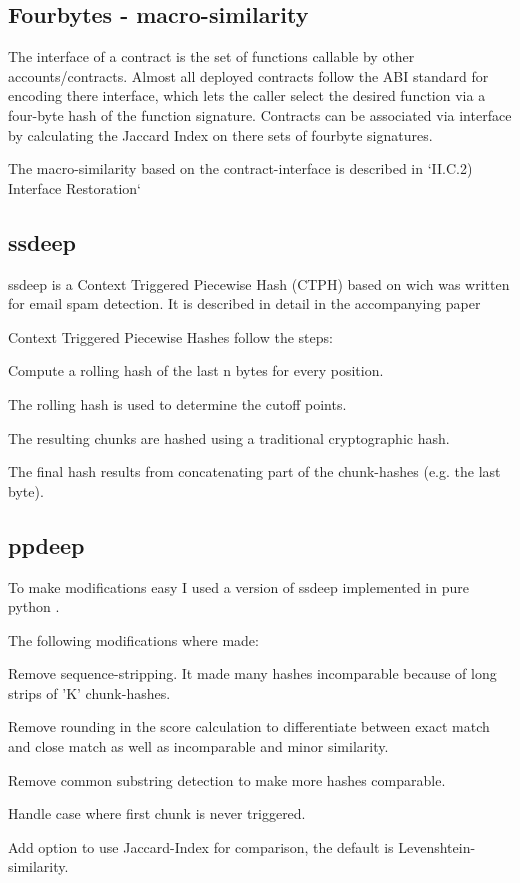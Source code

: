 \documentclass[../main.tex]{subfiles}
\begin{document}
\subsection{Fourbytes - macro-similarity}

The interface of a contract is the set of functions callable by other accounts/contracts.
Almost all deployed contracts follow the ABI standard for encoding there interface, which lets the caller select the desired function via a four-byte hash of the function signature.
Contracts can be associated via interface by calculating the Jaccard Index on there sets of fourbyte signatures.

The macro-similarity based on the contract-interface is described in `II.C.2) Interface Restoration` 

\subsection{ssdeep}
ssdeep is a Context Triggered Piecewise Hash (CTPH) based on  wich was written for email spam detection. It is described in detail in the accompanying paper 

Context Triggered Piecewise Hashes follow the steps:
\begin{ol}
  \item Compute a rolling hash of the last n bytes for every position.
  \item The rolling hash is used to determine the cutoff points.
  \item The resulting chunks are hashed using a traditional cryptographic hash.
  \item The final hash results from concatenating part of the chunk-hashes (e.g. the last byte).
\end{ol}

\subsection{ppdeep}
To make modifications easy I used a version of ssdeep implemented in pure python .

The following modifications where made:
\begin{ul}
  \item Remove sequence-stripping. It made many hashes incomparable because of long strips of 'K' chunk-hashes.
  \item Remove rounding in the score calculation to differentiate between exact match and close match as well as incomparable and minor similarity.
  \item Remove common substring detection to make more hashes comparable.
  \item Handle case where first chunk is never triggered.
  \item Add option to use Jaccard-Index for comparison, the default is Levenshtein-similarity.
\end{ul}
\end{document}
